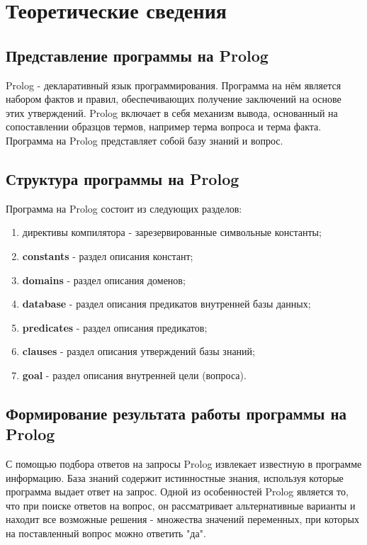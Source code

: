 \chapter{Теоретические сведения}

\section{Представление программы на Prolog}

Prolog - декларативный язык программирования. Программа на нём является набором фактов и правил, обеспечивающих получение заключений на основе этих утверждений. Prolog включает в себя механизм вывода, основанный на сопоставлении образцов термов, например терма вопроса и терма факта. Программа на Prolog представляет собой базу знаний и вопрос.

\section{Структура программы на Prolog}

Программа на Prolog состоит из следующих разделов:
\begin{enumerate}
    \item директивы компилятора - зарезервированные символьные константы;
    \item \textbf{constants} - раздел описания констант;
    \item \textbf{domains} - раздел описания доменов;
    \item \textbf{database} - раздел описания предикатов внутренней базы данных;
    \item \textbf{predicates} - раздел описания предикатов;
    \item \textbf{clauses} - раздел описания утверждений базы знаний;
    \item \textbf{goal} - раздел описания внутренней цели (вопроса).
\end{enumerate}

\section{Формирование результата работы программы на Prolog}

С помощью подбора ответов на запросы Prolog извлекает известную в программе информацию. База знаний содержит истинностные знания, используя которые программа выдает ответ на запрос. Одной из особенностей Prolog является то, что при поиске ответов на вопрос, он рассматривает альтернативные варианты и находит все возможные решения - множества значений переменных, при которых на поставленный вопрос можно ответить "да".

